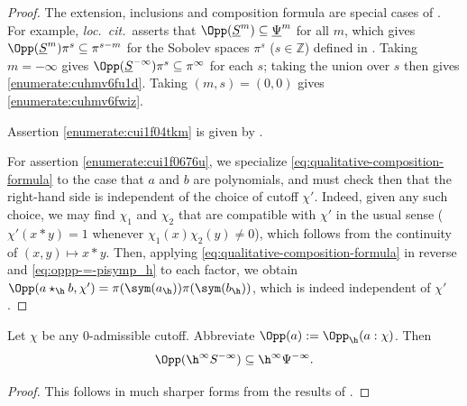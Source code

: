 \begin{proof}
  The extension, inclusions and composition formula are special cases of \cite[Thm 10.6]{2020arXiv201202187N}.  For example, \emph{loc.\ cit.}\ asserts that \(\Opp(\underline{S}^m) \subseteq \underline{\Psi}^m\) for all \(m\), which gives \(\Opp(\underline{S}^m) \pi^s \subseteq \pi^{s - m}\) for the Sobolev spaces \(\pi^s\) (\(s \in \mathbb{Z}\)) defined in \cite[\S10.1]{2020arXiv201202187N}.  Taking \(m = - \infty\) gives \(\Opp(\underline{S}^{-\infty}) \pi^s \subseteq \pi^\infty\) for each \(s\); taking the union over \(s\) then gives \eqref{enumerate:cuhmv6fu1d}.  Taking \((m, s) =(0, 0)\) gives \eqref{enumerate:cuhmv6fwiz}.

  Assertion \eqref{enumerate:cui1f04tkm} is given by \cite[\S5.2, \S8.1]{nelson-venkatesh-1}.

  For assertion \eqref{enumerate:cui1f0676u}, we specialize \eqref{eq:qualitative-composition-formula} to the case that $a$ and $b$ are polynomials, and must check then that the right-hand side is independent of the choice of cutoff $\chi '$.  Indeed, given any such choice, we may find $\chi_1$ and $\chi_2$ that are compatible with $\chi '$ in the usual sense ($\chi '(x \ast y) = 1$ whenever $\chi_1(x) \chi_2(y) \neq 0$), which follows from the continuity of $(x,y) \mapsto x \ast y$.  Then, applying \eqref{eq:qualitative-composition-formula} in reverse and \eqref{eq:oppp-=-pisymp_h} to each factor, we obtain $\Opp(a \star_{\h} b, \chi ') = \pi(\sym(a_{\h})) \pi(\sym(b_{\h}))$, which is indeed independent of $\chi '$.
\end{proof}


\begin{lemma}\label{lem:let-chi-be}
  Let $\chi$ be any $0$-admissible cutoff.  Abbreviate $\Opp(a) := \Opp_{\h}(a:\chi)$.  Then
  \begin{equation*}
    \Opp(\h^\infty S^{-\infty}) \subseteq \h^\infty \Psi^{-\infty}.
  \end{equation*}
\end{lemma}
\begin{proof}
  This follows in much sharper forms from the results of \cite[\S10]{2020arXiv201202187N}.
\end{proof}

